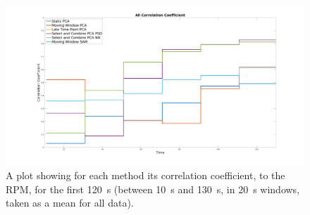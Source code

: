     \begin{figure}
        
        \centering
        
        \includegraphics[width=1.0\linewidth]{figures/all_correlation_coefficient_stairs.png}
        
        
        \vspace{-0.5cm}
        
        \captionsetup{singlelinecheck=false, justification=centering}
        \caption{
        A plot showing for each method its correlation coefficient, to the \gls{RPM}, for the first \SI{120}{\second} (between \SI{10}{\second} and \SI{130}{\second}, in \SI{20}{\second} windows, taken as a mean for all data).}
        
        \label{fig:all_cross_correlation}
        
        \vspace{-0.5cm}
    \end{figure}
    
    
    
        
